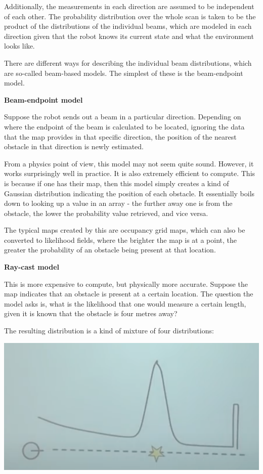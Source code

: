 \documentclass[a4paper]{article}
\begin{document}
Additionally, the measurements in each direction are assumed to be independent of each other. The probability distribution over the whole scan is taken to be the product of the distributions of the individual beams, which are modeled in each direction given that the robot knows its current state and what the environment looks like.

There are different ways for describing the individual beam distributions, which are so-called beam-based models. The simplest of these is the beam-endpoint model.

\textbf{Beam-endpoint model}

Suppose the robot sends out a beam in a particular direction. Depending on where the endpoint of the beam is calculated to be located, ignoring the data that the map provides in that specific direction, the position of the nearest obstacle in that direction is newly estimated.

From a physics point of view, this model may not seem quite sound. However, it works surprisingly well in practice. It is also extremely efficient to compute. This is because if one has their map, then this model simply creates a kind of Gaussian distribution indicating the position of each obstacle. It essentially boils down to looking up a value in an array - the further away one is from the obstacle, the lower the probability value retrieved, and vice versa.

The typical maps created by this are occupancy grid maps, which can also be converted to likelihood fields, where the brighter the map is at a point, the greater the probability of an obstacle being present at that location.

\textbf{Ray-cast model}

This is more expensive to compute, but physically more accurate. Suppose the map indicates that an obstacle is present at a certain location. The question the model asks is, what is the likelihood that one would measure a certain length, given it is known that the obstacle is four metres away?

The resulting distribution is a kind of mixture of four distributions:

\begin{center}
    \includegraphics[scale=0.5]{raycast}
\end{center}
\end{document}
